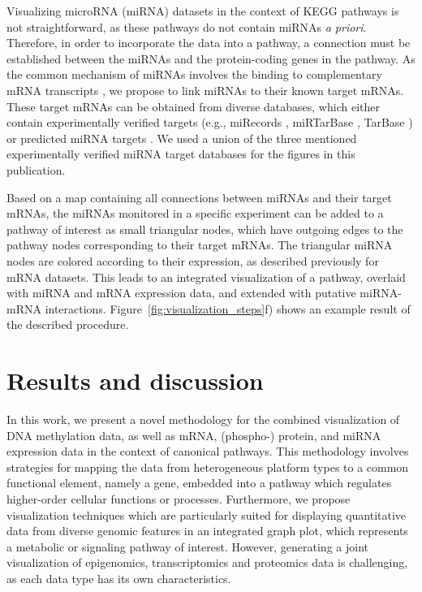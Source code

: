 \documentclass{bioinfo}
\begin{document}
Visualizing microRNA (miRNA) datasets in the context of KEGG pathways is not straightforward, as
these pathways do not contain miRNAs \emph{a priori}. Therefore, in order to incorporate the data into a
pathway, a connection must be established between the miRNAs and the protein-coding genes
in the pathway. As the common mechanism of miRNAs involves the binding to complementary mRNA
transcripts \citep{Bartel2004}, we propose to link miRNAs to their known target mRNAs. These target
mRNAs can be obtained from diverse databases, which either contain experimentally verified targets
(e.g., miRecords \citep[see][]{miRecords}, miRTarBase \citep[see][]{miRTarBase}, TarBase
\citep[see][]{TarBase}) or predicted miRNA targets \citep[reviewed in][]{Alexiou2009}.
We used a union of the three mentioned experimentally verified miRNA target databases for the
figures in this publication.


Based on a map containing all connections between miRNAs and their target mRNAs, the miRNAs
monitored in a specific experiment can be added to a pathway of interest as small triangular nodes,
which have outgoing edges to the pathway nodes corresponding to their target mRNAs. The triangular
miRNA nodes are colored according to their expression, as described previously for mRNA datasets.
This leads to an integrated visualization of a pathway, overlaid with miRNA and mRNA expression
data, and extended with putative miRNA-mRNA interactions. Figure~\ref{fig:visualization_steps}f)
shows an example result of the described procedure.


\section{Results and discussion}

In this work, we present a novel methodology for the combined visualization of DNA methylation data,
as well as mRNA, (phospho-) protein, and miRNA expression data in the context of canonical pathways.
This methodology involves strategies for mapping the data from heterogeneous platform types to a common
functional element, namely a gene, embedded into a pathway which regulates higher-order cellular 
functions or processes. Furthermore, we propose visualization techniques which are particularly suited for 
displaying quantitative data from diverse genomic features in an integrated graph plot,  
which represents a metabolic or signaling pathway of interest. However, generating a joint visualization of 
epigenomics, transcriptomics and proteomics data is challenging, as each data type has 
its own characteristics.
\end{document}
